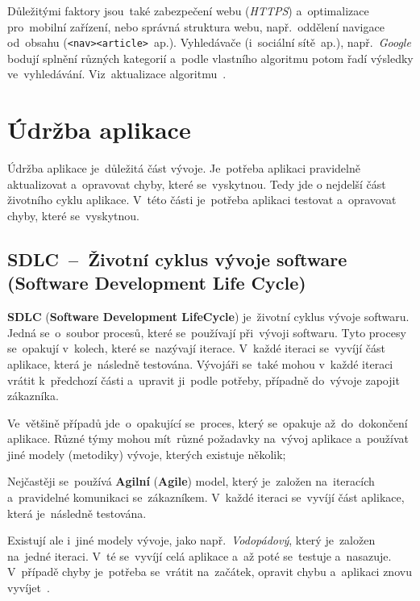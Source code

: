 \documentclass[11pt,a4paper]{report}
\begin{document}
                Důležitými faktory jsou~také zabezpečení webu (\emph{HTTPS}) a~optimalizace pro~mobilní zařízení, nebo správná struktura webu, např.~oddělení navigace od~obsahu (\texttt{<nav><article>}~ap.). Vyhledávače (i~sociální sítě~ap.), např.~\emph{Google} bodují splnění různých kategorií a~podle vlastního algoritmu potom řadí výsledky ve~vyhledávání. Viz~aktualizace algoritmu~\cite{hladis2016aktualizace}.

        \section{Údržba aplikace}
            Údržba aplikace je~důležitá část vývoje. Je~potřeba aplikaci pravidelně aktualizovat a~opravovat chyby, které se~vyskytnou.
            Tedy jde o nejdelší část životního cyklu aplikace. V~této části je~potřeba aplikaci testovat a~opravovat chyby, které se~vyskytnou.
            
            \subsection{SDLC~--~Životní cyklus vývoje software (Software Development Life Cycle)}
                \textbf{SDLC} (\textbf{Software Development LifeCycle}) je~životní cyklus vývoje softwaru. Jedná se~o~soubor procesů, které se~používají při~vývoji softwaru. Tyto procesy se~opakují v~kolech, které se~nazývají iterace. V~každé iteraci se~vyvíjí část aplikace, která je~následně testována. Vývojáři se~také mohou v~každé iteraci vrátit k~předchozí části a~upravit ji~podle potřeby, případně do~vývoje zapojit zákazníka.

                Ve~většině případů jde~o~opakující se~proces, který se~opakuje až~do~dokončení aplikace. Různé týmy mohou mít~různé požadavky na~vývoj aplikace a~používat jiné modely (metodiky) vývoje, kterých existuje několik;
                
                Nejčastěji se~používá \textbf{Agilní} (\textbf{Agile}) model, který je~založen na~iteracích a~pravidelné komunikaci se~zákazníkem. V~každé iteraci se~vyvíjí část aplikace, která je~následně testována.
                
                Existují ale i~jiné modely vývoje, jako např.~\emph{Vodopádový}, který je~založen na~jedné iteraci. V~té se~vyvíjí celá aplikace a~až poté se~testuje a~nasazuje. V~případě chyby je~potřeba se~vrátit na~začátek, opravit chybu a~aplikaci znovu vyvíjet~\cite{sdlc:kadlec2004agilni}.
\end{document}
